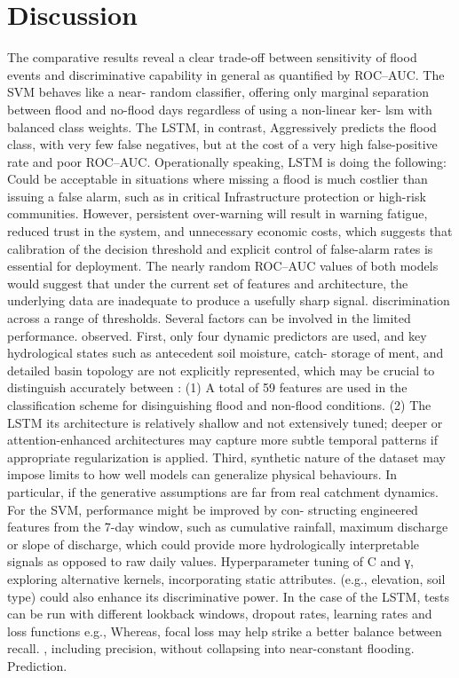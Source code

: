 \documentclass[conference]{IEEEtran}
\begin{document}
\section{Discussion}
The comparative results reveal a clear trade-off between
sensitivity of flood events and discriminative capability in general
as quantified by ROC–AUC. The SVM behaves like a near-
random classifier, offering only marginal separation between
flood and no-flood days regardless of using a non-linear ker-
lsm with balanced class weights. The LSTM, in contrast,
Aggressively predicts the flood class, with very few false
negatives, but at the cost of a very high false-positive rate and
poor ROC–AUC.
Operationally speaking, LSTM is doing the following:
Could be acceptable in situations where missing a flood is
much costlier than issuing a false alarm, such as in critical
Infrastructure protection or high-risk communities. However,
persistent over-warning will result in warning fatigue, reduced
trust in the system, and unnecessary economic costs, which
suggests that calibration of the decision threshold and explicit
control of false-alarm rates is essential for deployment. The
nearly random ROC–AUC values of both models would suggest that
under the current set of features and architecture, the underlying
data are inadequate to produce a usefully sharp signal.
discrimination across a range of thresholds.
Several factors can be involved in the limited performance.
observed. First, only four dynamic predictors are used, and key
hydrological states such as antecedent soil moisture, catch-
storage of ment, and detailed basin topology are not explicitly
represented, which may be crucial to distinguish accurately between
: (1) A total of 59 features are used in the classification scheme for disinguishing flood and non-flood conditions. (2) The LSTM
its architecture is relatively shallow and not extensively tuned;
deeper or attention-enhanced architectures may capture
more subtle temporal patterns if appropriate regularization is
applied. Third, synthetic nature of the dataset may impose
limits to how well models can generalize physical behaviours.
In particular, if the generative assumptions are far from real
catchment dynamics.
For the SVM, performance might be improved by con-
structing engineered features from the 7-day window, such as
cumulative rainfall, maximum discharge or slope of discharge,
which could provide more hydrologically interpretable signals
as opposed to raw daily values. Hyperparameter tuning of C and γ,
exploring alternative kernels, incorporating static attributes.
(e.g., elevation, soil type) could also enhance its discriminative
power. In the case of the LSTM, tests can be run with different lookback
windows, dropout rates, learning rates and loss functions e.g.,
Whereas, focal loss may help strike a better balance between recall.
, including precision, without collapsing into near-constant flooding.
Prediction.
 
\end{document}
